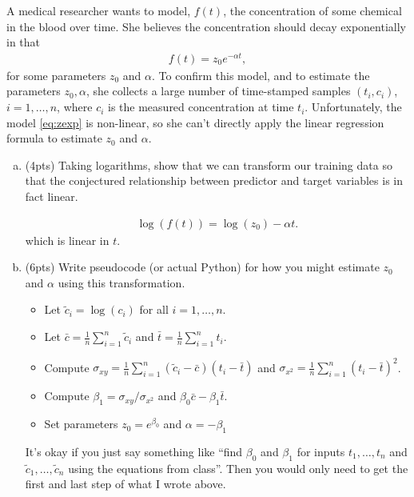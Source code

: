 \documentclass[10pt]{article}
\begin{document}
 A medical researcher wants to model, $f(t)$, the concentration
of some chemical in the blood
over time. She believes the concentration should decay exponentially in that
\begin{align}
\label{eq:zexp}
f(t) = z_0 e^{-\alpha t},
\end{align}
for some parameters $z_0$ and $\alpha$.
To confirm this model, and to estimate the parameters $z_0,\alpha$,
she collects a large number of time-stamped samples $(t_i,c_i)$, $i=1,\ldots,n$, where $c_i$ is the measured concentration at time $t_i$.
Unfortunately, the model \eqref{eq:zexp} is non-linear, so she can't directly apply
the linear regression formula to estimate $z_0$ and $\alpha$.
\begin{enumerate}[(a)]
	\item  (4pts) Taking logarithms, show that we can transform our training data so that the conjectured relationship between predictor and target variables is in fact linear. 
	
	\begin{align*}
		 \log(f(t)) = \log(z_0) - \alpha t.
	\end{align*}
	which is linear in $t$.
	
	\item  (6pts) Write pseudocode (or actual Python) for how you might estimate $z_0$ and $\alpha$ using this transformation. 
	\begin{itemize}
		\item Let $\tilde{c}_i = \log(c_i)$  for all  $i=1,\ldots,n$.
		\item Let $\bar{c} = \frac{1}{n}\sum_{i=1}^n \tilde{c}_i$ and $\bar{t} = \frac{1}{n}\sum_{i=1}^n {t}_i$.
		\item Compute $\sigma_{xy} = \frac{1}{n}\sum_{i=1}^n (\tilde{c}_i - \bar{c})(t_i - \bar{t})$ and $\sigma_{x^2} = \frac{1}{n}\sum_{i=1}^n (t_i - \bar{t})^2$.
		\item Compute $\beta_1 = \sigma_{xy} /\sigma_{x^2}$ and  $\beta_0 \bar{c} - \beta_1 \bar{t}$.
		\item Set parameters $z_0 = e^{\beta_0}$ and $\alpha =  -\beta_1$
	\end{itemize}
It's okay if you just say something like ``find $\beta_0$ and $\beta_1$ for inputs $t_1, \ldots, t_n$ and $\tilde{c}_1, \ldots, \tilde{c}_n$ using the equations from class''. Then you would only need to get the first and last step of what I wrote above. 
\end{enumerate}
\end{document}
